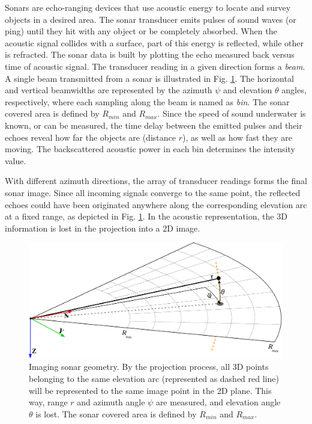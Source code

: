 \documentclass[final,5p,times]{elsarticle}
\begin{document}
Sonars are echo-ranging devices that use acoustic energy to locate and survey objects in a desired area. The sonar transducer emits pulses of sound waves (or ping) until they hit with any object or be completely absorbed. When the acoustic signal collides with a surface, part of this energy is reflected, while other is refracted. The sonar data is built by plotting the echo measured back versus time of acoustic signal. The transducer reading in a given direction forms a \textit{beam}. A single beam transmitted from a sonar is illustrated in Fig. \ref{fig:sonar_geometry}. The horizontal and vertical beamwidths are represented by the azimuth $\psi$ and elevation $\theta$ angles, respectively, where each sampling along the beam is named as \textit{bin}. The sonar covered area is defined by $R_{min}$ and $R_{max}$. Since the speed of sound underwater is known, or can be measured, the time delay between the emitted pulses and their echoes reveal how far the objects are (distance $r$), as well as how fast they are moving. The backscattered acoustic power in each bin determines the intensity value.

With different azimuth directions, the array of transducer readings forms the final sonar image. Since all incoming signals converge to the same point, the reflected echoes could have been originated anywhere along the corresponding elevation arc at a fixed range, as depicted in Fig. \ref{fig:sonar_geometry}. In the acoustic representation, the 3D information is lost in the projection into a 2D image.

\begin{figure}[t]
    \includegraphics[width=\columnwidth]{figs/sonar_geometry_2}
    \centering
    \captionsetup{justification=centering}
    \caption{Imaging sonar geometry. By the projection process, all 3D points belonging to the same elevation arc (represented as dashed red line) will be represented to the same image point in the 2D plane. This way, range $r$ and azimuth angle $\psi$ are measured, and elevation angle $\theta$ is lost. The sonar covered area is defined by $R_{min}$ and $R_{max}$.}
    \label{fig:sonar_geometry}
\end{figure}
\end{document}
